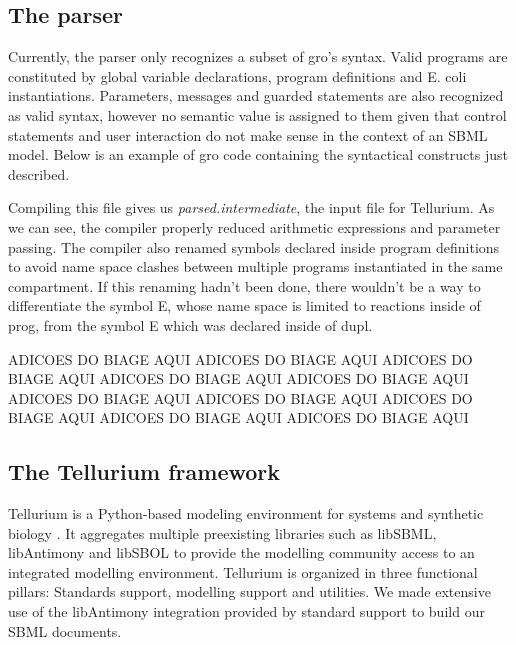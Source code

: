 \documentclass[12pt]{article}
\begin{document}
\subsection{The parser}
    
    Currently, the parser only recognizes a subset of gro's syntax. Valid programs are constituted by global variable declarations, program definitions and E. coli instantiations. Parameters, messages and guarded statements are also recognized as valid syntax, however no semantic value is assigned to them given that control statements and user interaction do not make sense in the context of an SBML model. Below is an example of gro code containing the syntactical constructs just described.
    
    
    
    Compiling this file gives us \textit{parsed.intermediate}, the input file for Tellurium. As we can see, the compiler properly reduced arithmetic expressions and parameter passing. The compiler also renamed symbols declared inside program definitions to avoid name space clashes between multiple programs instantiated in the same compartment. If this renaming hadn't been done, there wouldn't be a way to differentiate the symbol E, whose name space is limited to reactions inside of prog, from the symbol E which was declared inside of dupl.
    
    ADICOES DO BIAGE AQUI ADICOES DO BIAGE AQUI ADICOES DO BIAGE AQUI ADICOES DO BIAGE AQUI ADICOES DO BIAGE AQUI ADICOES DO BIAGE AQUI ADICOES DO BIAGE AQUI ADICOES DO BIAGE AQUI ADICOES DO BIAGE AQUI ADICOES DO BIAGE AQUI
    
    
    
\subsection{The Tellurium framework}

    Tellurium is a Python-based modeling environment for systems and synthetic biology \cite{Choi2018}. It aggregates multiple preexisting libraries such as libSBML, libAntimony and libSBOL to provide the modelling community access to an integrated modelling environment. Tellurium is organized in three functional pillars: Standards support, modelling support and utilities. We made extensive use of the libAntimony integration provided by standard support to build our SBML documents.
\end{document}

